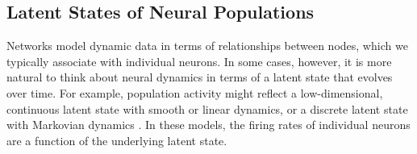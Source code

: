 


\subsection{Latent States of Neural Populations}
Networks model dynamic data in terms of relationships between nodes,
which we typically associate with individual neurons. In some cases,
however, it is more natural to think about neural dynamics in terms of 
a latent state that evolves over time. For example, population activity 
might reflect a low-dimensional, continuous latent state with smooth \cite{Yu09} 
or linear \cite{Smith-2003, paninski2010new} dynamics, or a discrete latent 
state with Markovian dynamics \cite[e.g.]{jones2007natural, latimer2015single}. 
In these models, the firing rates of individual neurons are a function
of the underlying latent state. 

